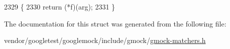 \begin{DoxyCode}
2329                                                      \{
2330     \textcolor{keywordflow}{return} (*f)(arg);
2331   \}
\end{DoxyCode}


The documentation for this struct was generated from the following file\+:\begin{DoxyCompactItemize}
\item 
vendor/googletest/googlemock/include/gmock/\hyperlink{gmock-matchers_8h}{gmock-\/matchers.\+h}\end{DoxyCompactItemize}
